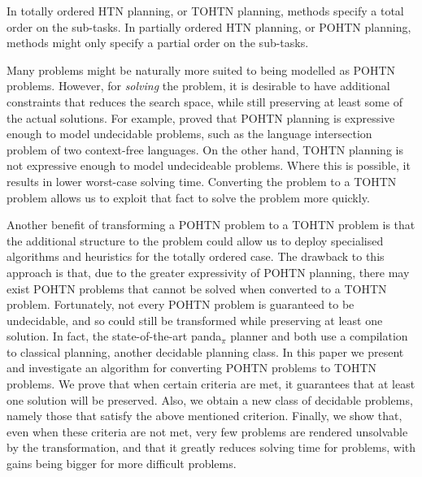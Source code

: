 \documentclass[letterpaper]{article} %
\begin{document}
In totally ordered HTN planning, or TOHTN planning, methods specify a total order on the sub-tasks. In partially ordered HTN planning, or POHTN planning, methods might only specify a partial order on the sub-tasks. 


Many problems might be naturally more suited to being modelled as POHTN problems. However, for \emph{solving} the problem, it is desirable to have additional constraints that reduces the search space, while still preserving at least some of the actual solutions. For example, \cite{ErolHTNExpressivity} proved that POHTN planning is expressive enough to model undecidable problems, such as the language intersection problem of two context-free languages. On the other hand, TOHTN planning is not expressive enough to model undecideable problems. Where this is possible, it results in lower worst-case solving time. Converting the problem to a TOHTN problem allows us to exploit that fact to solve the problem more quickly.

Another benefit of transforming a POHTN problem to a TOHTN problem is that the additional structure to the problem could allow us to deploy specialised algorithms and heuristics for the totally ordered case. %
The drawback to this approach is that, due to the greater expressivity of POHTN planning, there may exist POHTN problems that cannot be solved when converted to a TOHTN problem. 
Fortunately, not every POHTN problem is guaranteed to be undecidable, and so could still be transformed while preserving at least one solution. In fact, the state-of-the-art panda$_\pi$ planner and \cite{HTN2SAS} both use a compilation to classical planning, another decidable planning class.
In this paper we present and investigate an algorithm for converting POHTN problems to TOHTN problems. We prove that when certain criteria are met, it guarantees that at least one solution will be preserved. 
Also, we obtain a new class of decidable problems, namely those that satisfy the above mentioned criterion. Finally, we show that, even when these criteria are not met, very few problems are rendered unsolvable by the transformation, and that it greatly reduces solving time for problems, with gains being bigger for more difficult problems. 
\end{document}
